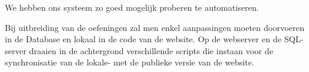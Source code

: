 We hebben ons systeem zo goed mogelijk proberen te automatiseren.

Bij uitbreiding van de oefeningen zal men enkel aanpassingen moeten doorvoeren in de Database en lokaal in de code van de website. Op de webserver en de SQL-server draaien in de achtergrond verschillende scripts die instaan voor de synchronisatie van de lokale- met de publieke versie van de website.